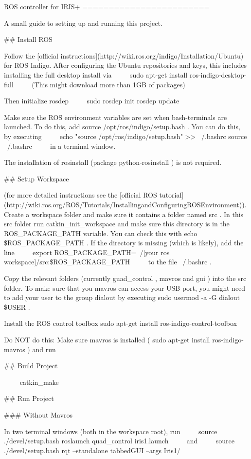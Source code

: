ROS controller for IRIS+
========================

A small guide to setting up and running this project.

\#\# Install ROS

Follow the [official instructions](http://wiki.ros.org/indigo/Installation/Ubuntu) for ROS Indigo.
After configuring the Ubuntu repositories and keys, this includes installing the full desktop install via
~~~~
sudo apt-get install ros-indigo-desktop-full
~~~~
(This might download more than 1GB of packages)

Then initialize  rosdep 
~~~~
sudo rosdep init
rosdep update
~~~~

Make sure the ROS environment variables are set when bash-terminals are launched.
To do this, add  source /opt/ros/indigo/setup.bash .
You can do this, by executing
~~~~
echo "source /opt/ros/indigo/setup.bash" >> ~/.bashrc
source ~/.bashrc
~~~~
in a terminal window.

The installation of rosinstall (package  python-rosinstall ) is not required.

\#\# Setup Workspace

(for more detailed instructions see the [official ROS tutorial](http://wiki.ros.org/ROS/Tutorials/InstallingandConfiguringROSEnvironment)).
Create a workspace folder and make sure it contains a folder named  src .
In this  src  folder run  catkin\_init\_workspace  and make sure this directory is in the  ROS\_PACKAGE\_PATH  variable.
You can check this with  echo \$ROS\_PACKAGE\_PATH .
If the directory is missing (which is likely), add the line
~~~~
export ROS\_PACKAGE\_PATH=~/[your ros workspace]/src:\${ROS\_PACKAGE\_PATH}
~~~~
to the file  ~/.bashrc .

Copy the relevant folders (currently  guad\_control ,  mavros  and  gui ) into the  src  folder.
To make sure that you mavros can access your USB port, you might need to add your user to the group  dialout  by executing  sudo usermod -a -G dialout \$USER .

Install the ROS control toolbox
 sudo apt-get install ros-indigo-control-toolbox 


Do NOT do this:
Make sure mavros is installed ( sudo apt-get install ros-indigo-mavros ) and run

\#\# Build Project

~~~~
catkin\_make
~~~~

\#\# Run Project

\#\#\# Without Mavros

In two terminal windows (both in the workspace root), run
~~~~
source ./devel/setup.bash
roslaunch quad\_control iris1.launch
~~~~
and
~~~~
source ./devel/setup.bash
rqt --standalone  tabbedGUI --args Iris1/
~~~~

